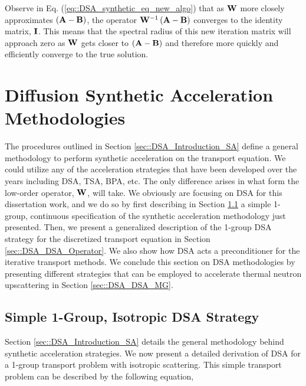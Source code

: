 \noindent Observe in Eq. (\ref{eq::DSA_synthetic_eq_new_algo}) that as ${\bf W}$ more closely approximates $\left(  {\bf A} - {\bf B}  \right)$, the operator ${\bf W}^{-1} \left(  {\bf A} - {\bf B}  \right)$ converges to the identity matrix, ${\bf I}$. This means that the spectral radius of this new iteration matrix will approach zero as ${\bf W}$ gets closer to $\left(  {\bf A} - {\bf B}  \right)$ and therefore more quickly and efficiently converge to the true solution. 

\section{Diffusion Synthetic Acceleration Methodologies}
\label{sec::DSA_DSA}

The procedures outlined in Section \ref{sec::DSA_Introduction_SA} define a general methodology to perform synthetic acceleration on the transport equation. We could utilize any of the acceleration strategies that have been developed over the years including DSA, TSA, BPA, etc. The only difference arises in what form the low-order operator, ${\bf W}$, will take. We obviously are focusing on DSA for this dissertation work, and we do so by first describing in Section \ref{sec::DSA_DSA_1G} a simple 1-group, continuous specification of the synthetic acceleration methodology just presented. Then, we present a generalized description of the 1-group DSA strategy for the discretized transport equation in Section \ref{sec::DSA_DSA_Operator}. We also show how DSA acts a preconditioner for the iterative transport methods. We conclude this section on DSA methodologies by presenting different strategies that can be employed to accelerate thermal neutron upscattering in Section \ref{sec::DSA_DSA_MG}.

\subsection{Simple 1-Group, Isotropic DSA Strategy}
\label{sec::DSA_DSA_1G}

Section \ref{sec::DSA_Introduction_SA} details the general methodology behind synthetic acceleration strategies. We now present a detailed derivation of DSA for a 1-group transport problem with isotropic scattering. This simple transport problem can be described by the following equation,

